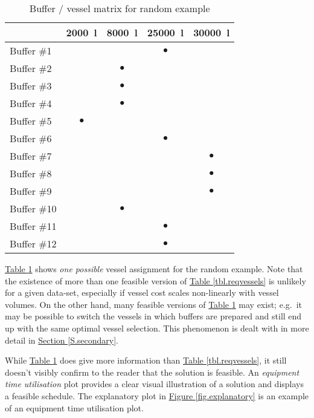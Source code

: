 \begin{table}[t]
    \centering
    \caption{Buffer / vessel matrix for random example}
    \label{tbl.bvmatrix}
    \begin{tabular}{l | c | c | c | c }
        & \SI{2000}{\litre} & \SI{8000}{\litre} & \SI{25000}{\litre} &
        \SI{30000}{\litre}\\ \hline
        Buffer \#1  & & & $\bullet$ & \\
        Buffer \#2  & & $\bullet$ & & \\
        Buffer \#3  & & $\bullet$ & & \\
        Buffer \#4  & & $\bullet$ & & \\
        Buffer \#5  & $\bullet$ & & & \\
        Buffer \#6  & & & $\bullet$ & \\
        Buffer \#7  & & & & $\bullet$ \\
        Buffer \#8  & & & & $\bullet$ \\
        Buffer \#9  & & & & $\bullet$ \\
        Buffer \#10 & & $\bullet$ & & \\
        Buffer \#11 & & & $\bullet$ & \\
        Buffer \#12 & & & $\bullet$ & \\
    \end{tabular}
\end{table}

\hyperref[tbl.bvmatrix]{Table \ref*{tbl.bvmatrix}} shows \emph{one possible}
vessel assignment for the random example.
Note that the existence of more than one feasible version of 
\hyperref[tbl.reqvessels]{Table \ref*{tbl.reqvessels}} is unlikely for a given
data-set, especially if vessel cost scales non-linearly with vessel volumes.
On the other hand, many feasible versions of
\hyperref[tbl.bvmatrix]{Table \ref*{tbl.bvmatrix}} may exist; e.g.\ it may be
possible to switch the vessels in which buffers are prepared and still end up
with the same optimal vessel selection.
This phenomenon is dealt with in more detail in 
\hyperref[S.secondary]{Section \ref*{S.secondary}}.

While \hyperref[tbl.bvmatrix]{Table \ref*{tbl.bvmatrix}} does give more
information than \hyperref[tbl.reqvessels]{Table \ref*{tbl.reqvessels}},
it still doesn't visibly confirm to the reader that the solution is feasible.
An \emph{equipment time utilisation} plot provides a clear visual illustration
of a solution and displays a feasible schedule.
The explanatory plot in 
\hyperref[fig.explanatory]{Figure \ref*{fig.explanatory}} is an example of an
equipment time utilisation plot.

